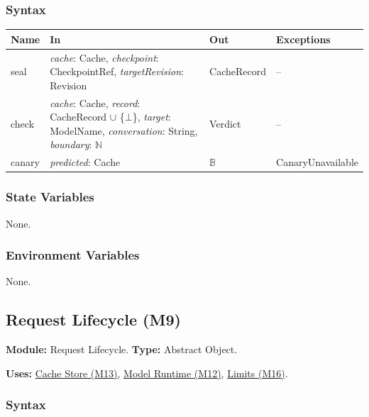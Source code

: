 \documentclass[12pt, titlepage]{article}
\begin{document}
\subsubsection*{Syntax}

\begin{tabularx}{\textwidth}{l X l X}
\toprule
\textbf{Name} & \textbf{In} & \textbf{Out} & \textbf{Exceptions}\\
\midrule
seal & \emph{cache}: Cache, \emph{checkpoint}: CheckpointRef, \emph{targetRevision}: Revision & CacheRecord & --\\
check & \emph{cache}: Cache, \emph{record}: CacheRecord $\cup$ \{$\bot$\}, \emph{target}: ModelName, \emph{conversation}: String, \emph{boundary}: $\mathbb{N}$ & Verdict & --\\
canary & \emph{predicted}: Cache & $\mathbb{B}$ & CanaryUnavailable\\
\bottomrule
\end{tabularx}

\subsubsection*{State Variables}

None.

\subsubsection*{Environment Variables}

None.

\newpage
\subsection{Request Lifecycle (M9)}\label{mLife}

\textbf{Module:} Request Lifecycle. \textbf{Type:} Abstract Object.

\textbf{Uses:} \hyperref[mCache]{Cache Store (M13)}, \hyperref[mModelRun]{Model Runtime (M12)}, \hyperref[mLimits]{Limits (M16)}.

\subsubsection*{Syntax}
\end{document}
